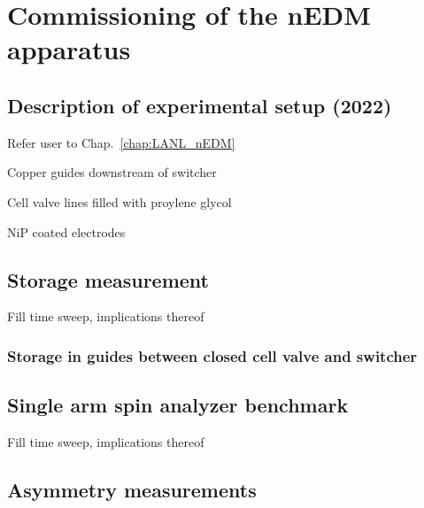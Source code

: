 
\chapter{Commissioning of the nEDM apparatus}\label{chap:nEDM_commissioning_dec2022}



\section{Description of experimental setup (2022)}


Refer user to Chap.~\ref{chap:LANL_nEDM}

Copper guides downstream of switcher

Cell valve lines filled with proylene glycol

NiP coated electrodes


\section{Storage measurement}


Fill time sweep, implications thereof


\subsection{Storage in guides between closed cell valve and switcher}



\section{Single arm spin analyzer benchmark}


Fill time sweep, implications thereof


\section{Asymmetry measurements}

